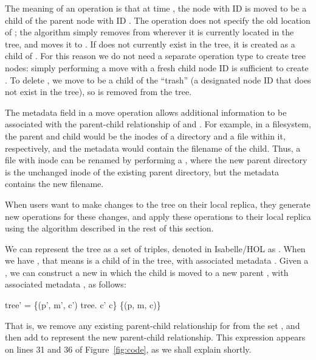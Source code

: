 \documentclass[sigplan,anonymous]{acmart}
\renewenvironment{isabelle}{%
  \medbreak\noindent%
  \renewcommand{\isanewline}{\\}%
  \begin{minipage}{\columnwidth}%
  \begin{isabellebody}%
  \begin{tabbing}%
}{%
  \end{tabbing}%
  \end{isabellebody}%
  \end{minipage}%
  \medbreak%
}
\begin{document}
The meaning of an operation  is that at time , the node with ID  is moved to be a child of the parent node with ID .
The operation does not specify the old location of ; the algorithm simply removes  from wherever it is currently located in the tree, and moves it to .
If  does not currently exist in the tree, it is created as a child of .
For this reason we do not need a separate operation type to create tree nodes: simply performing a move with a fresh child node ID  is sufficient to create .
To delete , we move  to be a child of the ``trash'' (a designated node ID that does not exist in the tree), so  is removed from the tree.

The metadata field  in a move operation allows additional information to be associated with the parent-child relationship of  and .
For example, in a filesystem, the parent and child would be the inodes of a directory and a file within it, respectively, and the metadata would contain the filename of the child.
Thus, a file with inode  can be renamed by performing a , where the new parent directory  is the unchanged inode of the existing parent directory, but the metadata  contains the new filename.

When users want to make changes to the tree on their local replica, they generate new  operations for these changes, and apply these operations to their local replica using the algorithm described in the rest of this section.

We can represent the tree as a set of  triples, denoted in Isabelle/HOL as .
When we have , that means  is a child of  in the tree, with associated metadata .
Given a , we can construct a new  in which the child  is moved to a new parent , with associated metadata , as follows:
\begin{isabelle}
tree' = \{(p', m', c') {\isasymin} tree. c' {\isasymnoteq} c\} {\isasymunion} \{(p, m, c)\}
\end{isabelle}
That is, we remove any existing parent-child relationship for  from the set , and then add  to represent the new parent-child relationship.
This expression appears on lines 31 and 36 of Figure~\ref{fig:code}, as we shall explain shortly.
\end{document}
